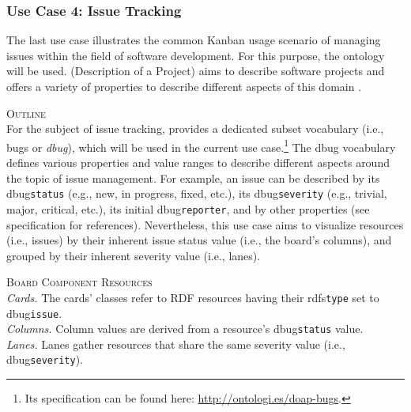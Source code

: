 
\subsubsection{Use Case 4: Issue Tracking}\label{ssec:UseCase4IssueTracking}

The last use case illustrates the common Kanban usage scenario of managing issues within the field of software development. For this purpose, the  ontology will be used.  (Description of a Project) aims to describe software projects and offers a variety of properties to describe different aspects of this domain \parencite{Wilder-James}. 


\vspace*{\baselineskip}

\noindent \textsc{Outline}\\
\noindent For the subject of issue tracking,  provides a dedicated subset vocabulary (i.e.,  bugs or \textit{dbug}), which will be used in the current use case.\footnote{Its specification can be found here: \url{http://ontologi.es/doap-bugs}.} The dbug vocabulary defines various properties and value ranges to describe different aspects around the topic of issue management. For example, an issue can be described by its \acrshort{dbug}\texttt{status} (e.g., new, in progress, fixed, etc.), its \acrshort{dbug}\texttt{severity} (e.g., trivial, major, critical, etc.), its initial \acrshort{dbug}\texttt{reporter}, and by other properties (see specification for references). Nevertheless, this use case aims to visualize resources (i.e., issues) by their inherent issue status value (i.e., the board’s columns), and grouped by their inherent severity value (i.e., lanes).



\noindent \textsc{Board Component Resources}\\[-1.5em]

\noindent \hangindent=1.7cm \textit{Cards.}\tabto{1.7cm} The cards’ classes refer to \acrshort*{RDF} resources having their \acrshort{rdfs}\texttt{type} set to \acrshort{dbug}\texttt{issue}.\\[-1.5em]

\noindent \hangindent=1.7cm \textit{Columns.}\tabto{1.7cm} Column values are derived from a resource’s \acrshort{dbug}\texttt{status} value.\\[-1.5em]

\noindent \hangindent=1.7cm \textit{Lanes.}\tabto{1.7cm} Lanes gather resources that share the same severity value (i.e., \acrshort{dbug}\texttt{severity}).


